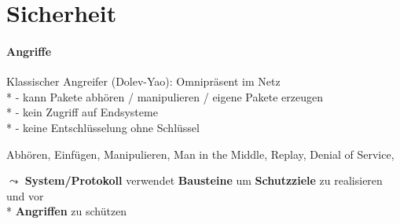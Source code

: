 \section{Sicherheit}

\paragraph{Angriffe}
\begin{items}
	\item Klassischer Angreifer (Dolev-Yao): Omnipräsent im Netz\\*
	- kann Pakete abhören / manipulieren / eigene Pakete erzeugen \\*
	- kein Zugriff auf Endsysteme\\*
	- keine Entschlüsselung ohne Schlüssel
	
	\item Abhören, Einfügen, Manipulieren, Man in the Middle, Replay, Denial of Service, 
	\item \( \leadsto \) \textbf{System/Protokoll} verwendet \textbf{Bausteine} um \textbf{Schutzziele} zu realisieren und vor \\* \phantom{.} \textbf{Angriffen} zu schützen
\end{items}


